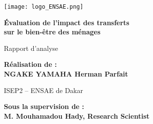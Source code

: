 \begin{titlepage}

\begin{center}
\begin{minipage}[c][0.95\textheight][c]{0.98\textwidth}
  \centering

  \texttt{[image: logo\_ENSAE.png]} \\
  \vspace{1.8cm}

  {\Huge \bfseries Évaluation de l’impact des transferts\\[0.3cm] sur le bien-être des ménages \par}
  \vspace{1.8cm}

  {\Large Rapport d'analyse \par}
  \vspace{2.5cm}

  {\LARGE \textbf{Réalisation de :}\\[0.3cm] \textbf{NGAKE YAMAHA Herman Parfait} \par}
  \vspace{1.2cm}

  {\Large ISEP2 – ENSAE de Dakar \par}
  \vspace{1.2cm}

  {\LARGE \textbf{Sous la supervision de :}\\[0.3cm] \textbf{M. Mouhamadou Hady, Research Scientist} \par}
  \vspace{1.2cm}

\end{minipage}
\end{center}

\end{titlepage}
